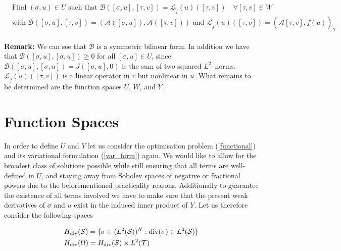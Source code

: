 \documentclass[../draft_1.tex]{subfiles}
\begin{document}
\begin{ceqn}
	\begin{align}
	\begin{aligned}
	\label{var_form}
	\text{ Find } (\sigma, u) \in U \text{ such that } \mathcal{B} ([\sigma, u], [\tau, v]) = \mathcal{L}_{\tilde{f}}(u)([\tau,v]) \quad \forall [\tau, v] \in W \\
 \text{ with } \mathcal{B} ([\sigma, u], [\tau, v]) = (\mathcal{A} ([\sigma, u]),  \mathcal{A} ([\tau, v])) \text{ and } \mathcal{L}_{\tilde{f}}(u)([\tau,v]) = (\mathcal{A}[\tau,v], \tilde{f}(u))_Y
\end{aligned}
	\end{align}
\end{ceqn}
\textbf{Remark:} We can see that $\mathcal{B} $ is a symmetric bilinear form. In addition we have that $ \mathcal{B} ([\sigma, u], [\sigma, u]) \geq 0 $ for all $[\sigma, u] \in U$, since $ \mathcal{B} ([\sigma, u], [\sigma, u]) = J([\sigma, u], 0)$ is the sum of two squared $L^2$--norms. $\mathcal{L}_{\tilde{f}}(u)([\tau,v])$ is a linear operator in $v$ but nonlinear in $u$. What remains to be determined are the function spaces $U$, $W$, and $Y$. 

\section{Function Spaces}

In order to define $U$ and $Y$ let us consider the optimisation problem (\ref{functional}) and its variational formulation (\ref{var_form}) again. We would like to allow for the broadest class of solutions possible while still ensuring that all terms are well-defined in $U$, and staying away from Sobolev spaces of negative or fractional powers due to the beforementioned practicality reasons. Additionally to guarantee the existence of all terms involved we have to make sure that the present weak derivatives of $\sigma$ and $u$ exist in the induced inner product of $Y$. Let us therefore consider the following spaces 
\begin{ceqn}
	\begin{align}
	&H_{\mathop{}\!\mathrm{div}}(\mathcal{S}) = \{\sigma \in (L^2(\mathcal{S}))^N : \mathop{}\!\mathrm{div} (\sigma) \in L^2(\mathcal{S})\} \\
    &H_{\mathop{}\!\mathrm{div}}(\Omega) = H_{\mathop{}\!\mathrm{div}}(\mathcal{S}) \times L^2(\mathcal{T}) 
    	\end{align}
\end{ceqn}
\end{document}
